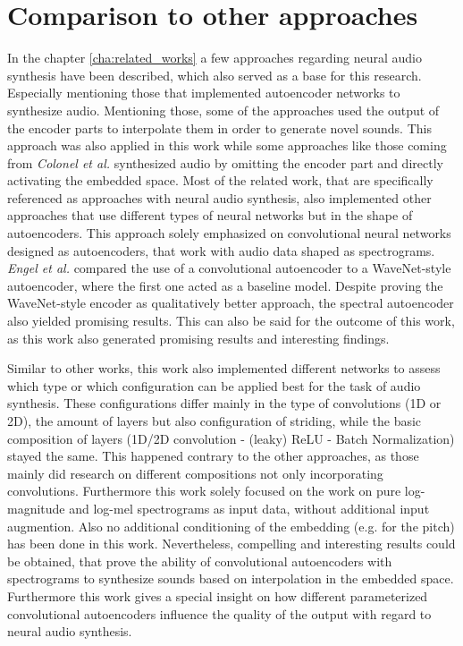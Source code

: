 \section{Comparison to other approaches}
In the chapter \ref{cha:related_works} a few approaches regarding neural audio synthesis have been described, which also served as a base for this research. Especially mentioning those that implemented autoencoder networks to synthesize audio. Mentioning those, some of the approaches used the output of the encoder parts to interpolate them in order to generate novel sounds. This approach was also applied in this work while some approaches like those coming from \textit{Colonel et al.} synthesized audio by omitting the encoder part and directly activating the embedded space. Most of the related work, that are specifically referenced as approaches with neural audio synthesis, also implemented other approaches that use different types of neural networks but in the shape of autoencoders. This approach solely emphasized on convolutional neural networks designed as autoencoders, that work with audio data shaped as spectrograms. \textit{Engel et al.} compared the use of a convolutional autoencoder to a WaveNet-style autoencoder, where the first one acted as a baseline model. Despite proving the WaveNet-style encoder as qualitatively better approach, the spectral autoencoder also yielded promising results. This can also be said for the outcome of this work, as this work also generated promising results and interesting findings.

\newpage
Similar to other works, this work also implemented different networks to assess which type or which configuration can be applied best for the task of audio synthesis. These configurations differ mainly in the type of convolutions (1D or 2D), the amount of layers but also configuration of striding, while the basic composition of layers (1D/2D convolution - (leaky) ReLU - Batch Normalization) stayed the same. This happened contrary to the other approaches, as those mainly did research on different compositions not only incorporating convolutions. Furthermore this work solely focused on the work on pure log-magnitude and log-mel spectrograms as input data, without additional input augmention. Also no additional conditioning of the embedding (e.g. for the pitch) has been done in this work. Nevertheless, compelling and interesting results could be obtained, that prove the ability of convolutional autoencoders with spectrograms to synthesize sounds based on interpolation in the embedded space. Furthermore this work gives a special insight on how different parameterized convolutional autoencoders influence the quality of the output with regard to neural audio synthesis.



